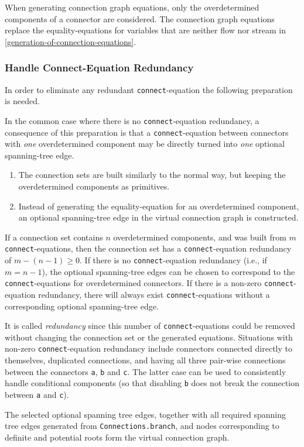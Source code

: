 When generating connection graph equations, only the overdetermined components of a connector are considered.
The connection graph equations replace the equality-equations for variables that are neither flow nor stream in \cref{generation-of-connection-equations}.

\subsubsection{Handle Connect-Equation Redundancy}
In order to eliminate any redundant \lstinline!connect!-equation the following preparation is needed.
\begin{nonnormative}
In the common case where there is no \lstinline!connect!-equation redundancy, a consequence of this preparation is that a \lstinline!connect!-equation between connectors with \emph{one} overdetermined component may be directly turned into \emph{one} optional spanning-tree edge.
\end{nonnormative}
\begin{enumerate}
\item
  The connection sets are built similarly to the normal way, but keeping the overdetermined components as primitives.
\item
  Instead of generating the equality-equation for an overdetermined component, an optional spanning-tree edge in the virtual connection graph is constructed.
\end{enumerate}
\begin{nonnormative}
If a connection set contains $n$ overdetermined components, and was built from $m$ \lstinline!connect!-equations, then the connection set has a \lstinline!connect!-equation redundancy of $m - (n - 1) \geq 0$.
If there is no \lstinline!connect!-equation redundancy (i.e., if $m=n-1$), the optional spanning-tree edges can be chosen to correspond to the \lstinline!connect!-equations for overdetermined connectors.
If there is a non-zero \lstinline!connect!-equation redundancy, there will always exist \lstinline!connect!-equations without a corresponding optional spanning-tree edge.

It is called \emph{redundancy} since this number of \lstinline!connect!-equations could be removed without changing the connection set or the generated equations.
Situations with non-zero \lstinline!connect!-equation redundancy include connectors connected directly to themselves, duplicated connections, and having all three pair-wise connections between the connectors \lstinline!a!, \lstinline!b! and \lstinline!c!.
The latter case can be used to consistently handle conditional components (so that disabling \lstinline!b! does not break the connection between \lstinline!a! and \lstinline!c!).
\end{nonnormative}
The selected optional spanning tree edges, together with all required spanning tree edges generated from \lstinline!Connections.branch!, and nodes corresponding to definite and potential roots form the virtual connection graph.

